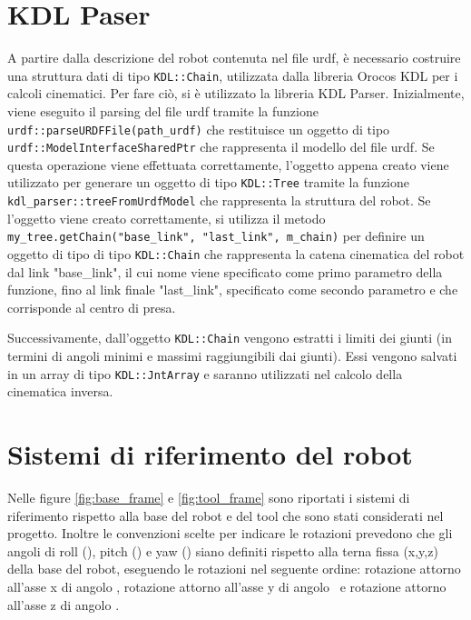 \section{KDL Paser}
A partire dalla descrizione del robot contenuta nel file urdf, è necessario costruire una struttura dati di tipo \texttt{KDL::Chain}, utilizzata dalla libreria Orocos KDL per i calcoli cinematici. Per fare ciò, si è utilizzato la libreria KDL Parser. Inizialmente, viene eseguito il parsing del file urdf tramite la funzione \texttt{urdf::parseURDFFile(path\_urdf)} che restituisce un oggetto di tipo \texttt{urdf::ModelInterfaceSharedPtr} che rappresenta il modello del file urdf. Se questa operazione viene effettuata correttamente, l'oggetto appena creato viene utilizzato per generare un oggetto di tipo \texttt{KDL::Tree} tramite la funzione \texttt{kdl\_parser::treeFromUrdfModel} che rappresenta la struttura del robot. Se l'oggetto viene creato correttamente, si utilizza il metodo \texttt{my\_tree.getChain("base\_link", "last\_link", m\_chain)} per definire un oggetto di tipo di tipo \texttt{KDL::Chain} che rappresenta la catena cinematica del robot dal link "base\_link", il cui nome viene specificato come primo parametro della funzione, fino al link finale "last\_link", specificato come secondo parametro e che corrisponde al centro di presa.

Successivamente, dall'oggetto \texttt{KDL::Chain} vengono estratti i limiti dei giunti (in termini di angoli minimi e massimi raggiungibili dai giunti). Essi vengono salvati in un array di tipo \texttt{KDL::JntArray} e saranno utilizzati nel calcolo della cinematica inversa.

\section{Sistemi di riferimento del robot}
Nelle figure \ref{fig:base_frame} e \ref{fig:tool_frame} sono riportati i sistemi di riferimento rispetto alla base del robot e del tool che sono stati considerati nel progetto. Inoltre le convenzioni scelte per indicare le rotazioni prevedono che gli angoli di roll (\textalpha), pitch (\textbeta) e yaw (\textgamma) siano definiti rispetto alla terna fissa (x,y,z) della base del robot, eseguendo le rotazioni nel seguente ordine: rotazione attorno all'asse x di angolo \textalpha, rotazione attorno all'asse y di angolo \textbeta\ e rotazione attorno all'asse z di angolo \textgamma.

